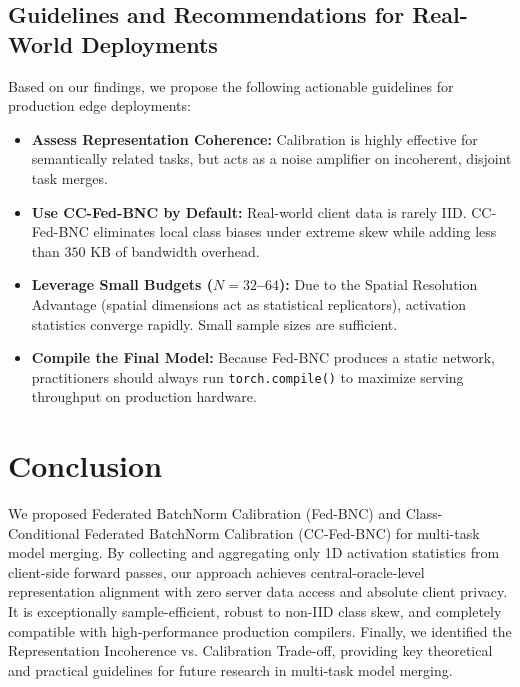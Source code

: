 \documentclass{article}
\theoremstyle{plain}
\theoremstyle{definition}
\theoremstyle{remark}
\begin{document}
\subsection{Guidelines and Recommendations for Real-World Deployments}
\label{subsec:guidelines}
Based on our findings, we propose the following actionable guidelines for production edge deployments:
\begin{itemize}
    \item \textbf{Assess Representation Coherence:} Calibration is highly effective for semantically related tasks, but acts as a noise amplifier on incoherent, disjoint task merges.
    \item \textbf{Use CC-Fed-BNC by Default:} Real-world client data is rarely IID. CC-Fed-BNC eliminates local class biases under extreme skew while adding less than $350\text{ KB}$ of bandwidth overhead.
    \item \textbf{Leverage Small Budgets ($N\!=\!32$--$64$):} Due to the Spatial Resolution Advantage (spatial dimensions act as statistical replicators), activation statistics converge rapidly. Small sample sizes are sufficient.
    \item \textbf{Compile the Final Model:} Because Fed-BNC produces a static network, practitioners should always run \texttt{torch.compile()} to maximize serving throughput on production hardware.
\end{itemize}

\section{Conclusion}
\label{sec:conclusion}
We proposed Federated BatchNorm Calibration (Fed-BNC) and Class-Conditional Federated BatchNorm Calibration (CC-Fed-BNC) for multi-task model merging. By collecting and aggregating only 1D activation statistics from client-side forward passes, our approach achieves central-oracle-level representation alignment with zero server data access and absolute client privacy. It is exceptionally sample-efficient, robust to non-IID class skew, and completely compatible with high-performance production compilers. Finally, we identified the Representation Incoherence vs. Calibration Trade-off, providing key theoretical and practical guidelines for future research in multi-task model merging.



\end{document}
